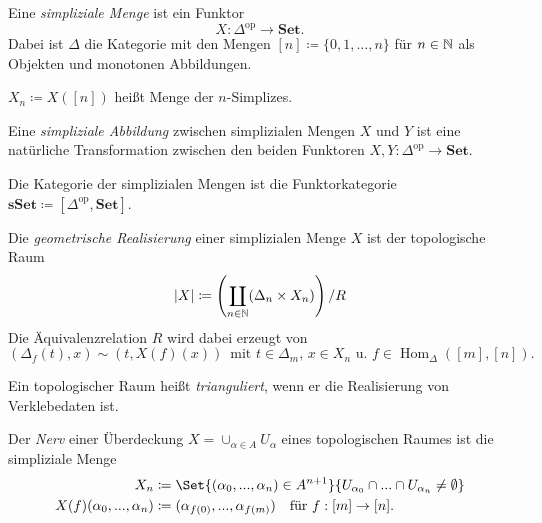 \documentclass{cheat-sheet}
\newcommand{\SetC}{\mathbf{Set}} %
\newcommand{\sSet}{\mathbf{sSet}} %
\newcommand{\op}{\mathrm{op}} %
\DeclareMathOperator{\Hom}{Hom} %
\begin{document}


\begin{defn}
  Eine \emph{simpliziale Menge} ist ein Funktor
  \[ X : \Delta^\op \to \SetC. \]
  Dabei ist $\Delta$ die Kategorie mit den Mengen
  $[n] \coloneqq \{ 0, 1, \ldots, n \}$ für $n \in \mathbb{N}$ als Objekten und monotonen Abbildungen.
\end{defn}

\begin{nota}
  $X_n \coloneqq X([n])$ heißt Menge der $n$-Simplizes.
\end{nota}

\begin{defn}
  Eine \emph{simpliziale Abbildung} zwischen simplizialen Mengen $X$ und $Y$ ist eine natürliche Transformation zwischen den beiden Funktoren $X, Y : \Delta^\op \to \SetC$.
\end{defn}

\begin{defn}
  Die Kategorie der simplizialen Mengen ist die Funktorkategorie $\sSet \coloneqq [\Delta^\op, \SetC]$.
\end{defn}

\begin{defn}
  Die \emph{geometrische Realisierung} einer simplizialen Menge $X$ ist der topologische Raum
  \[ \lvert X\rvert \coloneqq \left( \coprod_{n \in \mathbb{N}} (\Delta_n \times X_{n}) \right) / R \]
  Die Äquivalenzrelation $R$ wird dabei erzeugt von
  \[
    (\Delta_f(t), x) \sim (t, X(f)(x)) \enspace
    \text{mit $t \in \Delta_m$, $x \in X_n$ u. $f \in \Hom_\Delta([m], [n])$.}
  \]
\end{defn}

\begin{defn}
  Ein topologischer Raum heißt \emph{trianguliert}, wenn er die Realisierung von Verklebedaten ist.
\end{defn}

\begin{defn}
  Der \emph{Nerv} einer Überdeckung $X = \cup_{\alpha \in A} U_\alpha$ eines topologischen Raumes ist die simpliziale Menge
  \begin{align*}
    X_n & \coloneqq \Set{(\alpha_0, \nldots, \alpha_n) \in A^{n+1}}{ U_{\alpha_0} \cap \nldots \cap U_{\alpha_n} \not= \emptyset } \\
    X(f)(\alpha_0, \nldots, \alpha_n) & \coloneqq (\alpha_{f(0)}, \nldots, \alpha_{f(m)}) \quad \text{für } f : [m] \to [n].
  \end{align*}
\end{defn}
\end{document}
